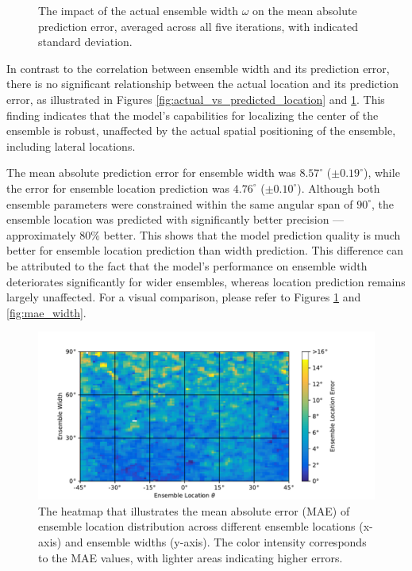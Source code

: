 \documentclass{article}
\begin{document}
\begin{figure}[ht]
\begin{minipage}[t]{0.45\linewidth}
    \caption{\label{fig:mae_location}The impact of the actual ensemble width $\omega$ on the mean absolute prediction error, averaged across all five iterations, with indicated standard deviation.}
  \end{minipage}
\end{figure}

In contrast to the correlation between ensemble width and its prediction error, there is no significant relationship between the actual location and its prediction error, as illustrated in Figures \ref{fig:actual_vs_predicted_location} and \ref{fig:mae_location}. This finding indicates that the model's capabilities for localizing the center of the ensemble is robust, unaffected by the actual spatial positioning of the ensemble, including lateral locations.

The mean absolute prediction error for ensemble width was $8.57^\circ$ ($\pm0.19^\circ$), while the error for ensemble location prediction was $4.76^\circ$ ($\pm0.10^\circ$). Although both ensemble parameters were constrained within the same angular span of $90^\circ$, the ensemble location was predicted with significantly better precision --- approximately $80\%$ better. This shows that the model prediction quality is much better for ensemble location prediction than width prediction. This difference can be attributed to the fact that the model's performance on ensemble width deteriorates significantly for wider ensembles, whereas location prediction remains largely unaffected. For a visual comparison, please refer to Figures \ref{fig:mae_location} and \ref{fig:mae_width}.

\begin{figure}[ht]
  \centering
  \includegraphics[width=\linewidth]{../figures/map_mae_location.pdf}
  \caption{\label{fig:map_mae_location}The heatmap that illustrates the mean absolute error (MAE) of ensemble location distribution across different ensemble locations (x-axis) and ensemble widths (y-axis). The color intensity corresponds to the MAE values, with lighter areas indicating higher errors.}
\end{figure}
\end{document}

